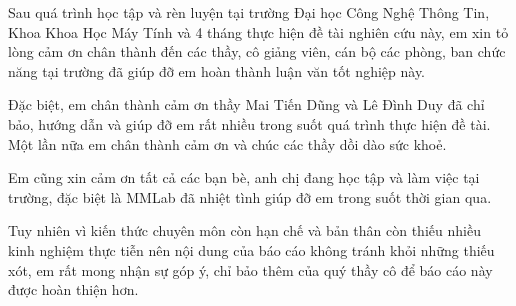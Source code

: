\begin{acknowledgements}      

Sau quá trình học tập và rèn luyện tại trường Đại học Công Nghệ Thông Tin, Khoa Khoa Học Máy Tính và 4 tháng thực hiện đề tài nghiên cứu này, em xin tỏ lòng cảm ơn chân thành đến các thầy, cô giảng viên, cán bộ các phòng, ban chức năng tại trường đã giúp đỡ em hoàn thành luận văn tốt nghiệp này.

Đặc biệt, em chân thành cảm ơn thầy Mai Tiến Dũng và Lê Đình Duy đã chỉ bảo, hướng dẫn và giúp đỡ em rất nhiều trong suốt quá trình thực hiện đề tài. Một lần nữa em chân thành cảm ơn và chúc các thầy dồi dào sức khoẻ.

Em cũng xin cảm ơn tất cả các bạn bè, anh chị đang học tập và làm việc tại trường, đặc biệt là MMLab đã nhiệt tình giúp đỡ em trong suốt thời gian qua.

Tuy nhiên vì kiến thức chuyên môn còn hạn chế và bản thân còn thiếu nhiều kinh nghiệm thực tiễn nên nội dung của báo cáo không tránh khỏi những thiếu xót, em rất mong nhận sự góp ý, chỉ bảo thêm của quý thầy cô để báo cáo này được hoàn thiện hơn.

\end{acknowledgements}
